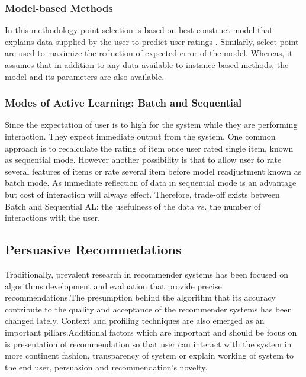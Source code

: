 \subsubsection{Model-based Methods}

In this methodology point selection is based on best construct model that explains data supplied by the user to predict user ratings \cite{adomavicius2005toward}. Similarly, select point are used to maximize the reduction of expected error of the model. Whereas, it assumes that in addition to any data available to instance-based methods, the model and its parameters are also available. 

\subsubsection{Modes of Active Learning: Batch and Sequential}

Since the expectation of user is to high for the system while they are performing interaction. They expect immediate output from the system. One common approach is to recalculate the rating of item once user rated single item, known as sequential mode. However another possibility is that to allow user to rate several features of items or rate several item before model readjustment known as batch mode. As immediate reflection of data in sequential mode is an advantage but cost of interaction will always effect. Therefore, trade-off exists between Batch and Sequential AL: the usefulness of the data vs. the number of interactions with the user. 

\subsection{Persuasive Recommedations}

Traditionally, prevalent research in recommender systems has been focused on algorithms development and evaluation that provide precise recommendations\cite{xiao2007commerce}.The presumption behind the algorithm that its accuracy contribute to the quality and acceptance of the recommender systems has been changed lately\cite{nanou2010effects}. Context and profiling techniques are also emerged as an important pillars.Additional factors which are important and should be focus on is presentation of recommendation so that user can interact with the system in more continent fashion\cite{nanou2010effects}, transparency of system or explain working of system to the end user\cite{sinha2002role}, persuasion\cite{pu2012evaluating} and recommendation’s novelty\cite{cremonesi2012investigating}.


